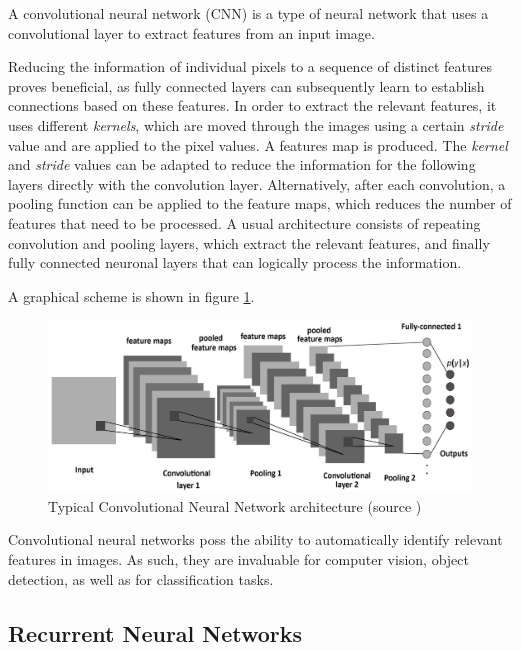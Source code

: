 \documentclass[12pt, a4paper, titlepage]{report}
\begin{document}
A convolutional neural network (CNN) is a type of neural network that uses a convolutional layer to extract features from an input image. 

Reducing the information of individual pixels to a sequence of distinct features proves beneficial, as fully connected layers can subsequently learn to establish connections based on these features. In order to extract the relevant features, it uses different \emph{kernels}, which are moved through the images using a certain \emph{stride} value and are applied to the pixel values. A features map is produced. The \emph{kernel} and \emph{stride} values can be adapted to reduce the information for the following layers directly with the convolution layer.
Alternatively, after each convolution, a pooling function can be applied to the feature maps, which reduces the number of features that need to be processed. A usual architecture consists of repeating convolution and pooling layers, which extract the relevant features, and finally fully connected neuronal layers that can logically process the information.

A graphical scheme is shown in figure \ref{fig:cnn_architecture}.

\begin{figure}[h]
	\centering
	\includegraphics[width=1.0\textwidth]{../rc/images/cnn_architecture.png}
   \caption{Typical Convolutional Neural Network architecture (source \cite{img_cnn_architecture})}
	\label{fig:cnn_architecture}
\end{figure}


Convolutional neural networks poss the ability to automatically identify relevant features in images. As such, they are invaluable for computer vision, object detection, as well as for classification tasks.


\subsection{Recurrent Neural Networks}
\end{document}
